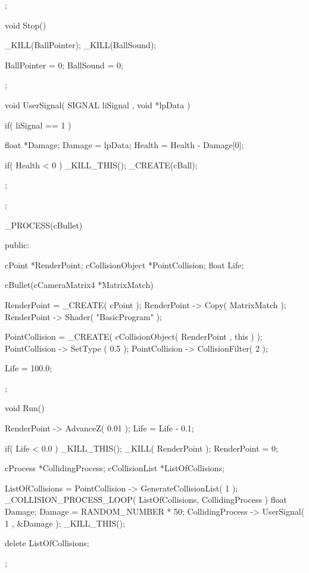 \begin{DoxyCode}
{{        };

        void Stop()
        {

                _KILL(BallPointer);
                _KILL(BallSound);

                BallPointer = 0;
                BallSound = 0;
        };

        void UserSignal( SIGNAL liSignal , void *lpData )
        {
                if( liSignal == 1 )
                {
                        float *Damage;
                        Damage = lpData;
                        Health = Health - Damage[0];

                        if( Health < 0 ) { _KILL_THIS(); _CREATE(cBall); }
                }

        };
};


_PROCESS(cBullet)
{
 public:

  cPoint *RenderPoint;
  cCollisionObject *PointCollision;
  float Life;

   cBullet(cCameraMatrix4 *MatrixMatch)
   {
                RenderPoint = _CREATE( cPoint );
                RenderPoint -> Copy( MatrixMatch );
                RenderPoint -> Shader( "BasicProgram" );

                PointCollision = _CREATE( cCollisionObject( RenderPoint , this ) 
      );
                PointCollision -> SetType ( 0.5 );
                PointCollision -> CollisionFilter( 2 );

                Life = 100.0;
   };

   void Run()
   {

                RenderPoint -> AdvanceZ( 0.01 );
                Life = Life - 0.1;

                if( Life < 0.0 )
                {
                        _KILL_THIS();
                        _KILL( RenderPoint );
                        RenderPoint = 0;
                }

                cProcess *CollidingProcess;
                cCollisionList *ListOfCollisions;

                ListOfCollisions = PointCollision -> GenerateCollisionList( 1 );
                _COLLISION_PROCESS_LOOP( ListOfCollisions, CollidingProcess )
                {
                        float Damage;
                        Damage = RANDOM_NUMBER * 50;
                        CollidingProcess -> UserSignal( 1 , &Damage );
                        _KILL_THIS();
                }

                delete ListOfCollisions;
   };

}
\end{DoxyCode}
